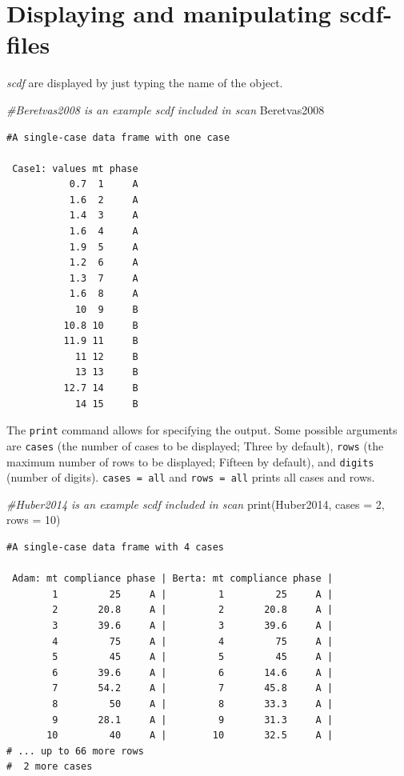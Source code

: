 \documentclass[
]{book}
\newenvironment{Shaded}{\begin{snugshade}}{\end{snugshade}}
\newcommand{\AttributeTok}[1]{\textcolor[rgb]{0.77,0.63,0.00}{#1}}
\newcommand{\CommentTok}[1]{\textcolor[rgb]{0.56,0.35,0.01}{\textit{#1}}}
\newcommand{\DecValTok}[1]{\textcolor[rgb]{0.00,0.00,0.81}{#1}}
\newcommand{\FunctionTok}[1]{\textcolor[rgb]{0.00,0.00,0.00}{#1}}
\newcommand{\NormalTok}[1]{#1}
\begin{document}
\hypertarget{displaying-and-manipulating-scdf-files}{%
\section{Displaying and manipulating scdf-files}\label{displaying-and-manipulating-scdf-files}}

\emph{scdf} are displayed by just typing the name of the object.

\begin{Shaded}
\begin{Highlighting}[]
\CommentTok{\#Beretvas2008 is an example scdf included in scan}
\NormalTok{Beretvas2008}
\end{Highlighting}
\end{Shaded}

\begin{verbatim}
#A single-case data frame with one case

 Case1: values mt phase
           0.7  1     A
           1.6  2     A
           1.4  3     A
           1.6  4     A
           1.9  5     A
           1.2  6     A
           1.3  7     A
           1.6  8     A
            10  9     B
          10.8 10     B
          11.9 11     B
            11 12     B
            13 13     B
          12.7 14     B
            14 15     B
\end{verbatim}

The \texttt{print} command allows for specifying the output. Some possible arguments are \texttt{cases} (the number of cases to be displayed; Three by default), \texttt{rows} (the maximum number of rows to be displayed; Fifteen by default), and \texttt{digits} (number of digits). \texttt{cases\ =\ \textquotesingle{}all\textquotesingle{}} and \texttt{rows\ =\ \textquotesingle{}all\textquotesingle{}} prints all cases and rows.

\begin{Shaded}
\begin{Highlighting}[]
\CommentTok{\#Huber2014 is an example scdf included in scan}
\FunctionTok{print}\NormalTok{(Huber2014, }\AttributeTok{cases =} \DecValTok{2}\NormalTok{, }\AttributeTok{rows =} \DecValTok{10}\NormalTok{)}
\end{Highlighting}
\end{Shaded}

\begin{verbatim}
#A single-case data frame with 4 cases

 Adam: mt compliance phase | Berta: mt compliance phase |
        1         25     A |         1         25     A |
        2       20.8     A |         2       20.8     A |
        3       39.6     A |         3       39.6     A |
        4         75     A |         4         75     A |
        5         45     A |         5         45     A |
        6       39.6     A |         6       14.6     A |
        7       54.2     A |         7       45.8     A |
        8         50     A |         8       33.3     A |
        9       28.1     A |         9       31.3     A |
       10         40     A |        10       32.5     A |
# ... up to 66 more rows
#  2 more cases
\end{verbatim}
\end{document}
